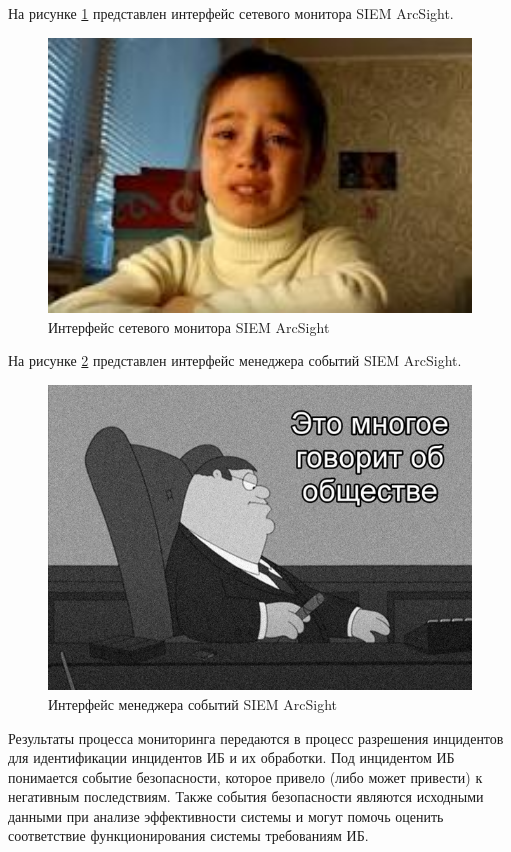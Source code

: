 На рисунке \ref{ArcSight1}  представлен интерфейс сетевого монитора SIEM ArcSight.

\begin{figure}[H]
  \centering
  \includegraphics[width=1\textwidth]{image/8.jpg}
  \caption{Интерфейс сетевого монитора SIEM ArcSight}
  \label{ArcSight1}
\end{figure}

На рисунке \ref{ArcSight2} представлен интерфейс менеджера событий SIEM ArcSight.


\begin{figure}[H]
  \centering
  \includegraphics[width=1\textwidth]{image/9.jpg}
  \caption{Интерфейс менеджера событий SIEM ArcSight}
  \label{ArcSight2}
\end{figure}

Результаты процесса мониторинга передаются в процесс разрешения инцидентов для идентификации инцидентов ИБ и их обработки. Под инцидентом ИБ понимается событие безопасности, которое привело (либо может привести) к негативным последствиям. Также события безопасности являются исходными данными при анализе эффективности системы и могут помочь оценить соответствие функционирования системы требованиям ИБ.

